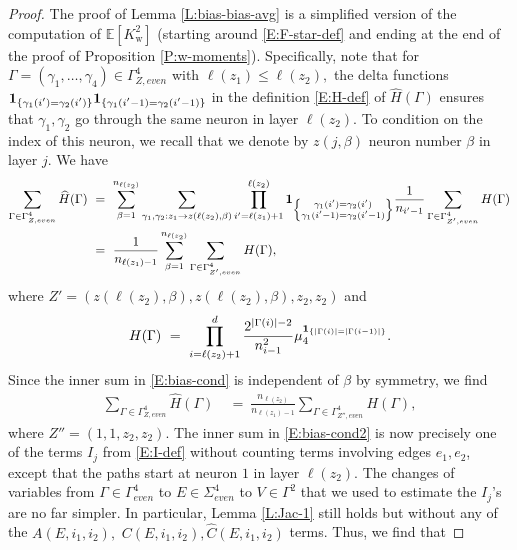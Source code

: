 \documentclass[11pt, reqno]{amsart}
\newcommand{\E}[1]{{\mathbb E}\left [#1\right]}
\newcommand{\gives}{\ensuremath{\rightarrow}}
\newcommand{\abs}[1]{\ensuremath{\left| #1 \right|}}
\newcommand{\lr}[1]{\ensuremath{\left(#1 \right)}}
\newcommand{\set}[1]{\ensuremath{\{#1\}}}
\newcommand{\Kw}{K_{\mathrm{w}}}
\begin{document}
\begin{proof}
The proof of Lemma \ref{L:bias-bias-avg} is a simplified version of the computation of $\E{\Kw^2}$ (starting around \eqref{E:F-star-def} and ending at the end of the proof of Proposition \ref{P:w-moments}). Specifically, note that for $\Gamma=\lr{\gamma_1,\ldots, \gamma_4}\in \Gamma_{Z,even}^{4}$ with $\ell(z_1)\leq \ell(z_2),$ the delta functions ${\bf 1}_{\left\{\substack{\gamma_1(i')=\gamma_2(i')}\right\}}{\bf 1}_{\left\{\substack{\gamma_1(i'-1)=\gamma_2(i'-1)}\right\}}$ in the definition \eqref{E:H-def} of $\widehat{H}(\Gamma)$ ensures that $\gamma_1,\gamma_2$ go through the same neuron in layer $\ell(z_2)$. To condition on the index of this neuron, we recall that we denote by $z(j,\beta)$ neuron number $\beta$ in layer $j.$  We have
\begin{align}
\notag \sum_{\Gamma\in \Gamma_{Z,even}^{4}}  \widehat{H}(\Gamma)~&=~\sum_{\beta=1}^{n_{\ell(z_2)}}\sum_{\substack{\gamma_1,\gamma_2:z_1\gives z(\ell(z_2),\beta)}} \prod_{i'=\ell(z_1)+1}^{\ell(z_2)} {\bf 1}_{\left\{\substack{\gamma_1(i')=\gamma_2(i')\\ \gamma_1(i'-1)=\gamma_2(i'-1)}\right\}} \frac{1}{n_{i'-1}}  \sum_{\Gamma\in \Gamma_{Z',even}^{4}} H(\Gamma)\\
&=~\frac{1}{n_{\ell(z_1)-1}} \sum_{\beta=1}^{n_{\ell(z_2)}}\sum_{\Gamma\in \Gamma_{Z',even}^{4}}H(\Gamma),\label{E:bias-cond}
\end{align}
where $Z'=(z(\ell(z_2), \beta), z(\ell(z_2), \beta), z_2, z_2)$ and
\[H(\Gamma)~=~\prod_{i=\ell(z_2)+1}^{d} \frac{2^{\abs{\Gamma(i)}-2}}{n_{i-1}^2} \mu_4^{{\bf 1}_{\set{\abs{\Gamma(i)}=\abs{\Gamma(i-1)}}}}.\]
Since the inner sum in \eqref{E:bias-cond} is independent of $\beta$ by symmetry, we find
\begin{align}
\sum_{\Gamma\in \Gamma_{Z,even}^{4}}  \widehat{H}(\Gamma)~&=~\frac{n_{\ell(z_2)}}{n_{\ell(z_1)-1}} \sum_{\Gamma\in \Gamma_{Z'',even}^{4}}H(\Gamma),\label{E:bias-cond2}
\end{align}
where $Z''=(1,1, z_2, z_2)$. The inner sum in \eqref{E:bias-cond2} is now precisely one of the terms $I_j$ from \eqref{E:I-def} without counting terms involving edges $e_1,e_2$, except that the paths start at neuron $1$ in layer $\ell(z_2)$. The changes of variables from $\Gamma\in \Gamma_{even}^4$ to $E\in \Sigma_{even}^4$ to $V\in \Gamma^2$ that we used to estimate the $I_j$'s are  no far simpler. In particular, Lemma \ref{L:Jac-1} still holds but without any of the $A(E,i_1,i_2),$ $C(E,i_1,i_2), \widehat{C}(E,i_1,i_2)$ terms. Thus, we find that 

\end{proof}
\end{document}
